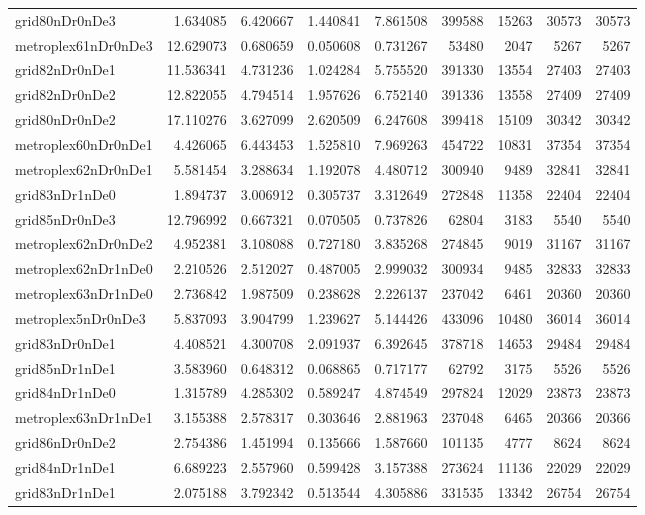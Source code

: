 \begin{longtable}{|l|r|r|r|r|r|r|r|r|}
grid80nDr0nDe3 & 1.634085 & 6.420667 & 1.440841 & 7.861508 & 399588 & 15263 & 30573 & 30573 \\
metroplex61nDr0nDe3 & 12.629073 & 0.680659 & 0.050608 & 0.731267 & 53480 & 2047 & 5267 & 5267 \\
grid82nDr0nDe1 & 11.536341 & 4.731236 & 1.024284 & 5.755520 & 391330 & 13554 & 27403 & 27403 \\
grid82nDr0nDe2 & 12.822055 & 4.794514 & 1.957626 & 6.752140 & 391336 & 13558 & 27409 & 27409 \\
grid80nDr0nDe2 & 17.110276 & 3.627099 & 2.620509 & 6.247608 & 399418 & 15109 & 30342 & 30342 \\
metroplex60nDr0nDe1 & 4.426065 & 6.443453 & 1.525810 & 7.969263 & 454722 & 10831 & 37354 & 37354 \\
metroplex62nDr0nDe1 & 5.581454 & 3.288634 & 1.192078 & 4.480712 & 300940 & 9489 & 32841 & 32841 \\
grid83nDr1nDe0 & 1.894737 & 3.006912 & 0.305737 & 3.312649 & 272848 & 11358 & 22404 & 22404 \\
grid85nDr0nDe3 & 12.796992 & 0.667321 & 0.070505 & 0.737826 & 62804 & 3183 & 5540 & 5540 \\
metroplex62nDr0nDe2 & 4.952381 & 3.108088 & 0.727180 & 3.835268 & 274845 & 9019 & 31167 & 31167 \\
metroplex62nDr1nDe0 & 2.210526 & 2.512027 & 0.487005 & 2.999032 & 300934 & 9485 & 32833 & 32833 \\
metroplex63nDr1nDe0 & 2.736842 & 1.987509 & 0.238628 & 2.226137 & 237042 & 6461 & 20360 & 20360 \\
metroplex5nDr0nDe3 & 5.837093 & 3.904799 & 1.239627 & 5.144426 & 433096 & 10480 & 36014 & 36014 \\
grid83nDr0nDe1 & 4.408521 & 4.300708 & 2.091937 & 6.392645 & 378718 & 14653 & 29484 & 29484 \\
grid85nDr1nDe1 & 3.583960 & 0.648312 & 0.068865 & 0.717177 & 62792 & 3175 & 5526 & 5526 \\
grid84nDr1nDe0 & 1.315789 & 4.285302 & 0.589247 & 4.874549 & 297824 & 12029 & 23873 & 23873 \\
metroplex63nDr1nDe1 & 3.155388 & 2.578317 & 0.303646 & 2.881963 & 237048 & 6465 & 20366 & 20366 \\
grid86nDr0nDe2 & 2.754386 & 1.451994 & 0.135666 & 1.587660 & 101135 & 4777 & 8624 & 8624 \\
grid84nDr1nDe1 & 6.689223 & 2.557960 & 0.599428 & 3.157388 & 273624 & 11136 & 22029 & 22029 \\
grid83nDr1nDe1 & 2.075188 & 3.792342 & 0.513544 & 4.305886 & 331535 & 13342 & 26754 & 26754 \\

\end{longtable}
